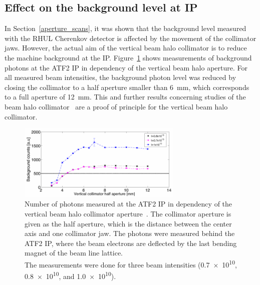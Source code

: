 \subsection{Effect on the background level at IP}
\label{collimator_bkg_IP}
In Section~\ref{aperture_scans}, it was shown that the background level measured with the RHUL Cherenkov detector is affected by the movement of the collimator jaws.
However, the actual aim of the vertical beam halo collimator is to reduce the machine background at the IP.
Figure~\ref{fig:IP_background} shows measurements of background photons at the ATF2 IP in dependency of the vertical beam halo aperture.
For all measured beam intensities, the background photon level was reduced by closing the collimator to a half aperture smaller than \SI{6}{\milli\meter}, which corresponds to a full aperture of \SI{12}{\milli\meter}.
This and further results concerning studies of the beam halo collimator~\cite{Nuria_Thesis} are a proof of principle for the vertical beam halo collimator.
\begin{figure}[!h]
\centering
\includegraphics[width=0.7\textwidth]{Figures/ATF/IP_background_Nuria_Thesis_p212.pdf}
\caption[Number of background particles at the ATF2 IP]{Number of photons measured at the ATF2 IP in dependency of the vertical beam halo collimator aperture~\cite[p. 212]{Nuria_Thesis}.
The collimator aperture is given as the half aperture, which is the distance between the center axis and one collimator jaw.
The photons were measured behind the ATF2 IP, where the beam electrons are deflected by the last bending magnet of the beam line lattice.
\\The measurements were done for three beam intensities (\num[detect-all]{0.7e10}, \num[detect-all]{0.8e10}, and \num[detect-all]{1.0e10}).}
\label{fig:IP_background}
\end{figure}